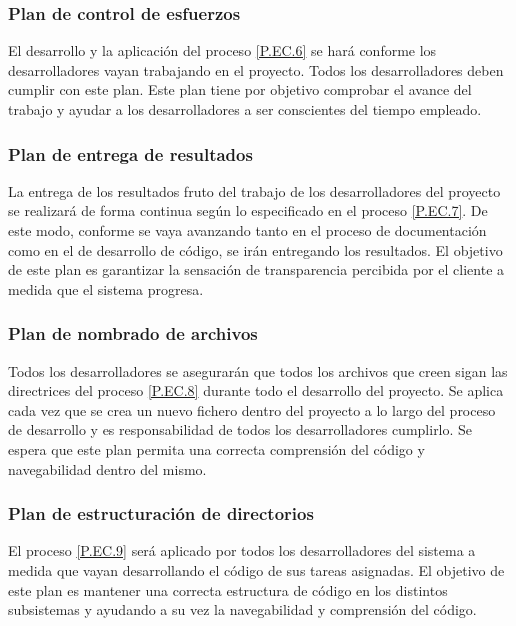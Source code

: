 \documentclass{article}
\begin{document}
\subsubsection{Plan de control de esfuerzos} \label{PL.EC.4}

El desarrollo y la aplicación del proceso \ref{P.EC.6} se hará conforme los desarrolladores vayan trabajando en el proyecto. Todos los desarrolladores deben cumplir con este plan. Este plan tiene por objetivo comprobar el avance del trabajo y ayudar a los desarrolladores a ser conscientes del tiempo empleado.

\subsubsection{Plan de entrega de resultados} \label{PL.EC.5}

La entrega de los resultados fruto del trabajo de los desarrolladores del proyecto se realizará de forma continua según lo especificado en el proceso \ref{P.EC.7}. De este modo, conforme se vaya avanzando tanto en el proceso de documentación como en el de desarrollo de código, se irán entregando los resultados.
El objetivo de este plan es garantizar la sensación de transparencia percibida por el cliente a medida que el sistema progresa.

\subsubsection{Plan de nombrado de archivos} \label{PL.EC.6}

Todos los desarrolladores se asegurarán que todos los archivos que creen sigan las directrices del proceso \ref{P.EC.8} durante todo el desarrollo del proyecto. Se aplica cada vez que se crea un nuevo fichero dentro del proyecto a lo largo del proceso de desarrollo y es responsabilidad de todos los desarrolladores cumplirlo. Se espera que este plan permita una correcta comprensión del código y navegabilidad dentro del mismo.

\subsubsection{Plan de estructuración de directorios} \label{PL.EC.7}

El proceso \ref{P.EC.9} será aplicado por todos los desarrolladores del sistema a medida que vayan desarrollando el código de sus tareas asignadas. El objetivo de este plan es mantener una correcta estructura de código en los distintos subsistemas y ayudando a su vez la navegabilidad y comprensión del código.
\end{document}
